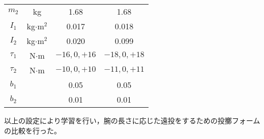 \begin{small}
\begin{table}[tb]
\begin{center}
{\begin{tabular}{c|c|c|c}
      $m_{2}$ & kg & 1.68 & 1.68\\
      $I_{1}$ & kg$\cdot$$\mathrm{m}^2$ & 0.017 & 0.018 \\
      $I_{2}$ & kg$\cdot$$\mathrm{m}^2$ & 0.020 & 0.099 \\
      $\tau_{1}$ & N$\cdot$m & $-16, 0, +16$ & $-18, 0, +18$ \\
      $\tau_{2}$ & N$\cdot$m & $-10, 0, +10$ & $-11, 0, +11$ \\
      $b_{1}$ &  & 0.05 & 0.05\\
      $b_{2}$ &  & 0.01 & 0.01\\
      \hline
    \end{tabular}
    }
  \end{center}
\end{table}
以上の設定により学習を行い，腕の長さに応じた遠投をするための投擲フォームの比較を行った。

\end{small}
